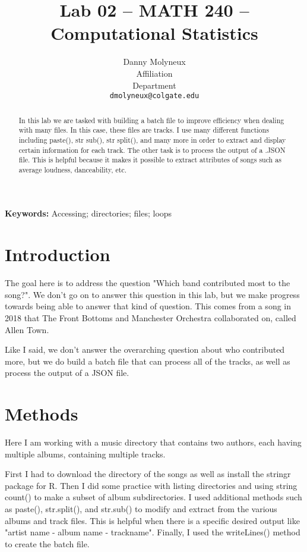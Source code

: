 \documentclass{article}\usepackage[]{graphicx}\usepackage[]{xcolor}
\begin{document}
\vspace{-1in}
\title{Lab 02 -- MATH 240 -- Computational Statistics}

\author{
  Danny Molyneux \\
  Affiliation  \\
  Department  \\
  {\tt dmolyneux@colgate.edu}
}

\date{}

\maketitle

\begin{multicols}{2}
\begin{abstract}
In this lab we are tasked with building a batch file to improve efficiency when dealing with many files. In this case, these files are tracks. I use many different functions including paste(), str sub(), str split(), and many more in order to extract and display certain information for each track. The other task is to process the output of a .JSON file. This is helpful because it makes it possible to extract attributes of songs such as average loudness, danceability, etc. 
\end{abstract}

\noindent \textbf{Keywords:} Accessing; directories; files; loops

\section{Introduction}
The goal here is to address the question "Which band contributed most to the song?". We don't go on to answer this question in this lab, but we make progress towards being able to answer that kind of question. This comes from a song in 2018 that The Front Bottoms and Manchester Orchestra collaborated on, called Allen Town. 

Like I said, we don't answer the overarching question about who contributed more, but we do build a batch file that can process all of the tracks, as well as process the output of a JSON file.

\section{Methods}
Here I am working with a music directory that contains two authors, each having multiple albums, containing multiple tracks.

First I had to download the directory of the songs as well as install the stringr \citep{stringr} package for R. Then I did some practice with listing directories and using string count() to make a subset of album subdirectories. I used additional methods such as paste(), str.split(), and str.sub() to modify and extract from the various albums and track files. This is helpful when there is a specific desired output like "artist name - album name - trackname". Finally, I used the writeLines() method to create the batch file.


\end{multicols}
\end{document}
